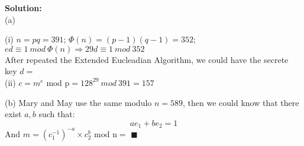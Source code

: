 \documentclass{article}
\newenvironment{solution}                               %
{\textbf{Solution:} \\}{$\blacksquare$\newline}         %
\newcommand{\leadto}{\Rightarrow}                       %
\newcommand{\modP}{\text{ mod p}}
\begin{document}
    \begin{solution}
        (a)

        (i) $n=pq=391$; $\Phi(n) = (p-1)(q-1) = 352$; \\
        $ed \equiv 1\ mod\ \Phi(n) \leadto 29d \equiv 1\ mod\ 352$ \\
        After repeated the Extended Eucleadian Algorithm, we could have the secrete key $d=$
        \\
        (ii) $c = m^e \modP = 128^{29}\ mod\ 391 = 157$

        (b) Mary and May use the same modulo $n=589$, then we could know that there exist $a,b$ such that:
        $$
            a e_1 + b e_2 = 1
        $$
        And $m = (c_1^{-1})^{-a} \times c_2^b \text{ mod n} = $
    \end{solution}
\end{document}
